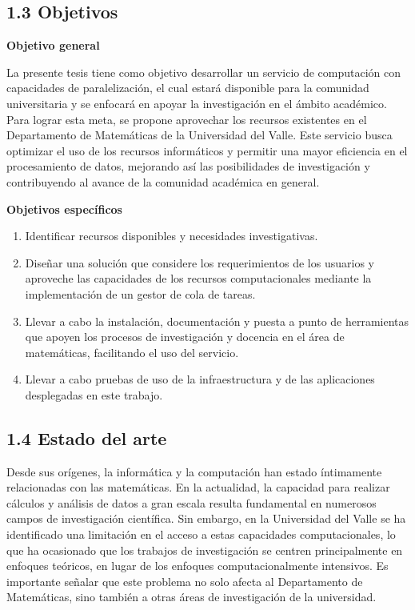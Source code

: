 \begin{spacing}{1.5}
  \subsection{1.3 Objetivos}

  \textbf{Objetivo general}

  La presente tesis tiene como objetivo desarrollar un servicio de computación
  con capacidades de paralelización, el cual estará disponible para la comunidad
  universitaria y se enfocará en apoyar la investigación en el ámbito académico.
  Para lograr esta meta, se propone aprovechar los recursos existentes en el
  Departamento de Matemáticas de la Universidad del Valle. Este servicio busca
  optimizar el uso de los recursos informáticos y permitir una mayor eficiencia
  en el procesamiento de datos, mejorando así las posibilidades de investigación
  y contribuyendo al avance de la comunidad académica en general.

  \textbf{Objetivos específicos}
  \begin{enumerate}
    \item Identificar recursos disponibles y necesidades investigativas.
    \item Diseñar una solución que considere los requerimientos de los usuarios
          y aproveche las capacidades de los recursos computacionales mediante la
          implementación de un gestor de cola de tareas.
    \item Llevar a cabo la instalación, documentación y puesta a punto de
          herramientas que apoyen los procesos de investigación y docencia en el área de
          matemáticas, facilitando el uso del servicio.
    \item  Llevar a cabo pruebas de uso de la infraestructura y de las
          aplicaciones desplegadas en este trabajo.\newline
  \end{enumerate}

  \subsection{1.4 Estado del arte}

  Desde sus orígenes, la informática y la computación han estado íntimamente
  relacionadas con las matemáticas. En la actualidad, la capacidad para realizar
  cálculos y análisis de datos a gran escala resulta fundamental en numerosos
  campos de investigación científica. Sin embargo, en la Universidad del Valle se
  ha identificado una limitación en el acceso a estas capacidades
  computacionales, lo que ha ocasionado que los trabajos de investigación se
  centren principalmente en enfoques teóricos, en lugar de los enfoques
  computacionalmente intensivos. Es importante señalar que este problema no solo
  afecta al Departamento de Matemáticas, sino también a otras áreas de
  investigación de la universidad.


\end{spacing}
